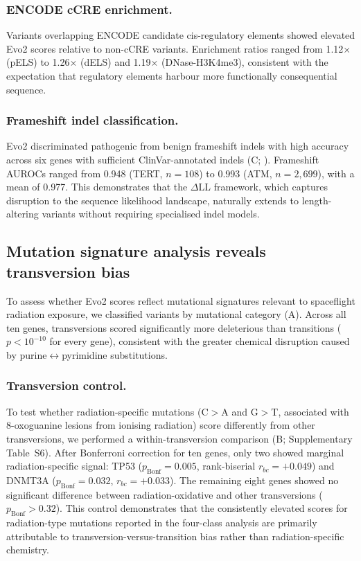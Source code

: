 \subsubsection*{ENCODE cCRE enrichment.}

Variants overlapping ENCODE candidate cis-regulatory elements showed elevated
Evo2 scores relative to non-cCRE variants. Enrichment ratios ranged from 1.12$\times$
(pELS) to 1.26$\times$ (dELS) and 1.19$\times$ (DNase-H3K4me3), consistent
with the expectation that regulatory elements harbour more functionally
consequential sequence.

\subsubsection*{Frameshift indel classification.}

Evo2 discriminated pathogenic from benign frameshift indels with high accuracy
across six genes with sufficient ClinVar-annotated indels
(C; ). Frameshift AUROCs ranged from 0.948 (TERT, $n = 108$)
to 0.993 (ATM, $n = 2{,}699$), with a mean of 0.977. This demonstrates that the
$\Delta$LL framework, which captures disruption to the sequence likelihood
landscape, naturally extends to length-altering variants without requiring
specialised indel models.

\subsection{Mutation signature analysis reveals transversion bias}
\label{sec:results_radiation}

To assess whether Evo2 scores reflect mutational signatures relevant to
spaceflight radiation exposure, we classified variants by mutational category
(A). Across all ten genes, transversions scored
significantly more deleterious than transitions ($p < 10^{-10}$ for every gene),
consistent with the greater chemical disruption caused by purine$\leftrightarrow$pyrimidine
substitutions.

\subsubsection*{Transversion control.}

To test whether radiation-specific mutations (C$>$A and G$>$T, associated with
8-oxoguanine lesions from ionising radiation) score differently from other
transversions, we performed a within-transversion comparison
(B; Supplementary Table~S6). After Bonferroni
correction for ten genes, only two showed marginal radiation-specific signal:
TP53 ($p_\text{Bonf} = 0.005$, rank-biserial $r_{bc} = +0.049$) and DNMT3A
($p_\text{Bonf} = 0.032$, $r_{bc} = +0.033$). The remaining eight genes showed
no significant difference between radiation-oxidative and other transversions
($p_\text{Bonf} > 0.32$). This control demonstrates that the consistently
elevated scores for radiation-type mutations reported in the four-class analysis
are primarily attributable to transversion-versus-transition bias rather than
radiation-specific chemistry.

